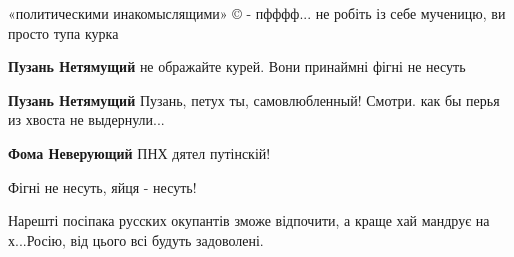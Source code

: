 \begin{itemize}
 
«политическими инакомыслящими» © - пфффф... не робіть із себе мученицю, ви просто тупа курка

\begin{itemize}
 
\textbf{Пузань Нетямущий} не ображайте курей. Вони принаймні фігні не несуть

 
\textbf{Пузань Нетямущий} Пузань, петух ты, самовлюбленный! Смотри. как бы перья из хвоста не выдернули...

 
\textbf{Фома Неверующий} ПНХ дятел путінскій!

 
Фігні не несуть, яйця - несуть!
\end{itemize}

 
Нарешті посіпака русских окупантів зможе відпочити, а краще хай мандрує на х...Росію, від цього всі будуть задоволені.

 

\end{itemize}
